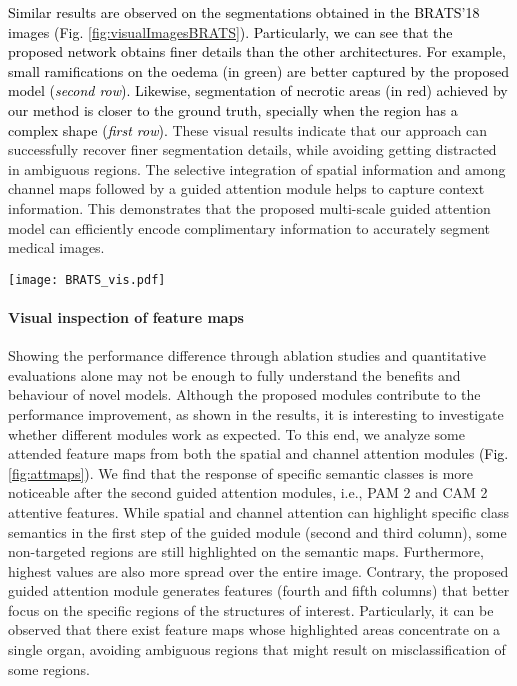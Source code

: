 \documentclass[journal]{IEEEtran}
\begin{document}
\textcolor{black}{Similar results are observed on the segmentations obtained in the BRATS'18 images (Fig. \ref{fig:visualImagesBRATS}). Particularly, we can see that the proposed network obtains finer details than the other architectures. For example, small ramifications on the oedema (in green) are better captured by the proposed model (\textit{second row}). Likewise, segmentation of necrotic areas (in red) achieved by our method is closer to the ground truth, specially when the region has a complex shape (\textit{first row}).} These visual results indicate that our approach can successfully recover finer segmentation details, while avoiding getting distracted in ambiguous regions. The selective integration of spatial information and among channel maps followed by a guided attention module helps to capture context information. This demonstrates that the proposed multi-scale guided attention model can efficiently encode complimentary information to accurately segment medical images. 

\begin{figure*}[h!]
    \centering
    \texttt{[image: BRATS\_vis.pdf]}
    \caption{\textcolor{black}{Results on three subjects on the BRATS Challenge dataset. In these figures, the following tumor structures are depicted: oedema (green), enhancing core (yellow) and necrotic or tumor core (red).}}
        \label{fig:visualImagesBRATS}
\end{figure*}

\paragraph*{\textbf{Visual inspection of feature maps}}

Showing the performance difference through ablation studies and quantitative evaluations alone may not be enough to fully understand the benefits and behaviour of novel models. Although the proposed modules contribute to the performance improvement, as shown in the results, it is interesting to investigate whether different modules work as expected. To this end, we analyze some attended feature maps from both the spatial and channel attention modules \textcolor{black}{(Fig. \ref{fig:attmaps})}. We find that the response of specific semantic classes is more noticeable after the second guided attention modules, i.e., PAM 2 and CAM 2 attentive features. While spatial and channel attention can highlight specific class semantics in the first step of the guided module (second and third column), some non-targeted regions are still highlighted on the semantic maps. Furthermore, highest values are also more spread over the entire image. Contrary, the proposed guided attention module generates features (fourth and fifth columns) that better focus on the specific regions of the structures of interest. Particularly, it can be observed that there exist feature maps whose highlighted areas concentrate on a single organ, avoiding ambiguous regions that might result on misclassification of some regions.
\end{document}
